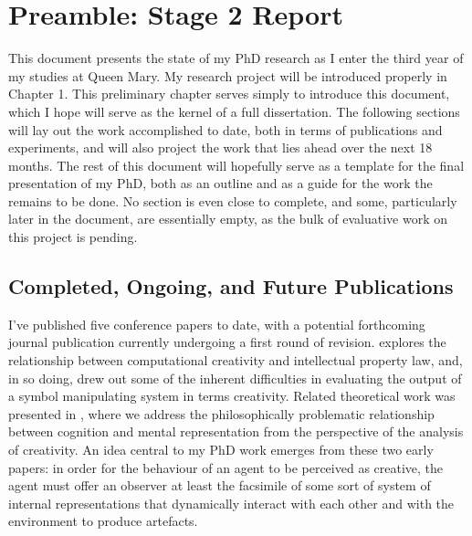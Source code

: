 \setcounter{page}{1}

\chapter{Preamble: Stage 2 Report}
This document presents the state of my PhD research as I enter the third year of my studies at Queen Mary.  My research project will be introduced properly in Chapter 1.  This preliminary chapter serves simply to introduce this document, which I hope will serve as the kernel of a full dissertation.  The following sections will lay out the work accomplished to date, both in terms of publications and experiments, and will also project the work that lies ahead over the next 18 months.  The rest of this document will hopefully serve as a template for the final presentation of my PhD, both as an outline and as a guide for the work the remains to be done.  No section is even close to complete, and some, particularly later in the document, are essentially empty, as the bulk of evaluative work on this project is pending.

\section{Completed, Ongoing, and Future Publications}
I've published five conference papers to date, with a potential forthcoming journal publication currently undergoing a first round of revision.  \cite{McGregor2014} explores the relationship between computational creativity and intellectual property law, and, in so doing, drew out some of the inherent difficulties in evaluating the output of a symbol manipulating system in terms creativity.  Related theoretical work was presented in \cite{McGregorEA2014}, where we address the philosophically problematic relationship between cognition and mental representation from the perspective of the analysis of creativity.  An idea central to my PhD work emerges from these two early papers: in order for the behaviour of an agent to be perceived as creative, the agent must offer an observer at least the facsimile of some sort of system of internal representations that dynamically interact with each other and with the environment to produce artefacts.

